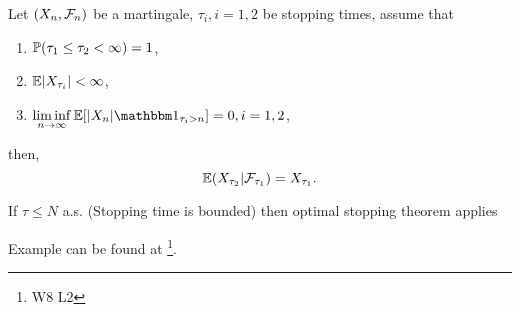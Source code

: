 \begin{thm}
\label{Doob} Let $(X_n, \mathcal{F}_n)$ be a martingale, $\tau_i, i=1,2$ be stopping times, assume that
\begin{enumerate}
    \item $\mathbb{P}(\tau_1 \leq \tau_2 < \infty) = 1$,
    \item $\mathbb{E}|X_{\tau_i}| < \infty$,
    \item $\linf{n\rightarrow \infty} \E[|X_n|\I{\tau_i > n}] = 0, i=1,2$,
\end{enumerate}then,
\begin{equation*}
    \mathbb{E}(X_{\tau_2}|\mathcal{F}_{\tau_1}) = X_{\tau_1}.
\end{equation*}
\end{thm}
\begin{rem}
If $\tau \leq N$ a.s. (Stopping time is bounded) then optimal stopping theorem applies
\end{rem}
Example can be found at \footnote{W8 L2}.

